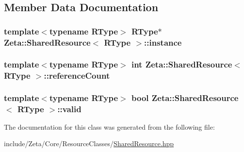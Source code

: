 \subsection{Member Data Documentation}
\hypertarget{classZeta_1_1SharedResource_ac9580c623e0c67cdcc4dadb34ceebba1}{
\subsubsection[{instance}]{\setlength{\rightskip}{0pt plus 5cm}template$<$typename R\+Type$>$ R\+Type$\ast$ {\bf Zeta\+::\+Shared\+Resource}$<$ R\+Type $>$\+::instance\hspace{0.3cm}{\ttfamily [private]}}}\label{classZeta_1_1SharedResource_ac9580c623e0c67cdcc4dadb34ceebba1}
\hypertarget{classZeta_1_1SharedResource_ac2cba2af1e886b9e371f9055b4f67097}{
\subsubsection[{reference\+Count}]{\setlength{\rightskip}{0pt plus 5cm}template$<$typename R\+Type$>$ int {\bf Zeta\+::\+Shared\+Resource}$<$ R\+Type $>$\+::reference\+Count\hspace{0.3cm}{\ttfamily [private]}}}\label{classZeta_1_1SharedResource_ac2cba2af1e886b9e371f9055b4f67097}
\hypertarget{classZeta_1_1SharedResource_aeff02cb931824d567b4f028b733e5ca1}{
\subsubsection[{valid}]{\setlength{\rightskip}{0pt plus 5cm}template$<$typename R\+Type$>$ bool {\bf Zeta\+::\+Shared\+Resource}$<$ R\+Type $>$\+::valid\hspace{0.3cm}{\ttfamily [private]}}}\label{classZeta_1_1SharedResource_aeff02cb931824d567b4f028b733e5ca1}


The documentation for this class was generated from the following file\+:\begin{DoxyCompactItemize}
\item 
include/\+Zeta/\+Core/\+Resource\+Classes/\hyperlink{SharedResource_8hpp}{Shared\+Resource.\+hpp}\end{DoxyCompactItemize}
